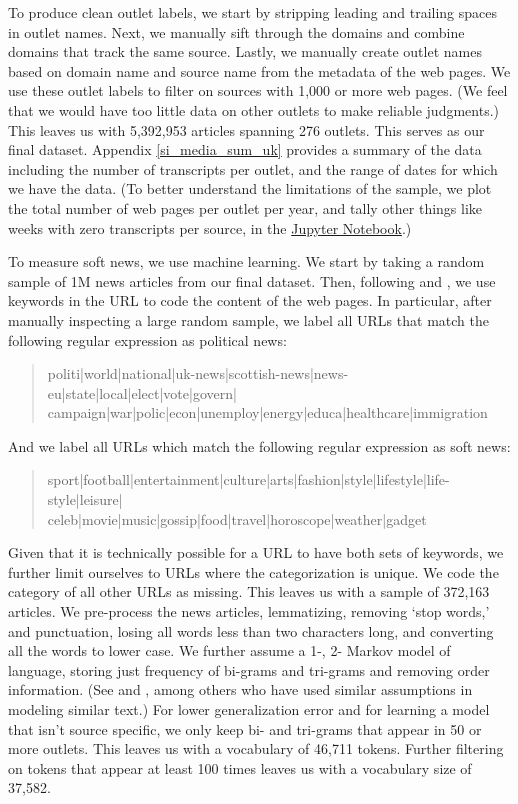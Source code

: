 \documentclass[12pt, letterpaper]{article}
\begin{document}
To produce clean outlet labels, we start by stripping leading and trailing spaces in outlet names. Next, we manually sift through the domains and combine domains that track the same source. Lastly, we manually create outlet names based on domain name and source name from the metadata of the web pages. We use these outlet labels to filter on sources with 1,000 or more web pages. (We feel that we would have too little data on other outlets to make reliable judgments.) This leaves us with 5,392,953 articles spanning 276 outlets. This serves as our final dataset. Appendix \ref{si_media_sum_uk} provides a summary of the data including the number of transcripts per outlet, and the range of dates for which we have the data. (To better understand the limitations of the sample, we plot the total number of web pages per outlet per year, and tally other things like weeks with zero transcripts per source, in the \href{https://github.com/not_news/uk_not_news/blob/master/scripts/01_subset_summarize_uk_news_media_data_by_label.ipynb}{Jupyter Notebook}.)

To measure soft news, we use machine learning.  We start by taking a random sample of 1M news articles from our final dataset. Then, following \citet{bakshy2015exposure} and \citet{flaxman2016filter}, we use keywords in the URL to code the content of the web pages. In particular, after manually inspecting a large random sample, we label all URLs that match the following regular expression as political news:

\begin{quote}
politi|world|national|uk-news|scottish-news|news-eu|state|local|elect|vote|govern|\\
campaign|war|polic|econ|unemploy|energy|educa|healthcare|immigration
\end{quote}

\noindent And we label all URLs which match the following regular expression as soft news: 
\begin{quote}
sport|football|entertainment|culture|arts|fashion|style|lifestyle|life-style|leisure|\\
celeb|movie|music|gossip|food|travel|horoscope|weather|gadget
\end{quote}

Given that it is technically possible for a URL to have both sets of keywords, we further limit ourselves to URLs where the categorization is unique. We code the category of all other URLs as missing. This leaves us with a sample of 372,163 articles. We pre-process the news articles, lemmatizing, removing `stop words,' and punctuation, losing all words less than two characters long, and converting all the words to lower case. We further assume a 1-, 2- Markov model of language, storing just frequency of bi-grams and tri-grams and removing order information. (See \citet{gentzkow2006drives} and \citet{martin2017bias}, among others who have used similar assumptions in modeling similar text.) For lower generalization error and for learning a model that isn't source specific, we only keep bi- and tri-grams that appear in 50 or more outlets. This leaves us with a vocabulary of 46,711 tokens. Further filtering on tokens that appear at least 100 times leaves us with a vocabulary size of 37,582. 
\end{document}
